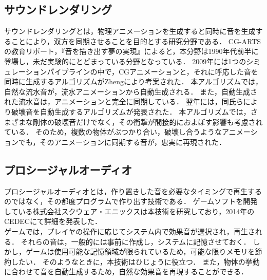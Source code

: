 \subsection{サウンドレンダリング}
サウンドレンダリングとは，物理アニメーションを生成すると同時に音を生成することにより，双方を同期させることを目的とする研究分野である．
CG-ARTSの教育リポート，『音を描き出す夢の実現』\cite{CG-ARTS}によると，本分野は1990年代前半に登場し，未だ実験的にとどまっている分野となっている．
2009年には1つのシミュレーションパイプラインの中で，CGアニメーションと，それに呼応した音を同時に生成するアルゴリズム\cite{james1}がZhengにより考案された．
本アルゴリズムでは，自然な流水音が，流水アニメーションから自動生成される．
また，自動生成された流水音は，アニメーションと完全に同期している．
%
翌年には，同氏らにより破壊音を自動生成するアルゴリズム\cite{james2}が発表された．
本アルゴリズムでは，さまざまな剛体の破壊音だけでなく，その衝撃が間接的におよぼす影響も考慮されている．
そのため，複数の物体がぶつかり合い，破壊し合うようなアニメーションでも，そのアニメーションに同期する音が，忠実に再現された．
%
\subsection{プロシージャルオーディオ}
プロシージャルオーディオとは，作り置きした音を必要なタイミングで再生するのではなく，その都度プログラムで作り出す技術である．
ゲームソフトを開発している株式会社スクウェア・エニックスは本技術を研究しており，2014年のCEDECにて詳細\cite{SQUARE}を発表した．\\
\indent
ゲームでは，プレイヤの操作に応じてシステム内で効果音が選択され，再生される．
それらの音は，一般的には事前に作成し，システムに記憶させておく．
しかし，ゲームは使用可能な記憶領域が限られているため，可能な限りメモリを節約したい．
そのようなときに，本技術はひじょうに役立つ．
また，物体の挙動に合わせて音を自動生成するため，自然な効果音を再現することができる．

